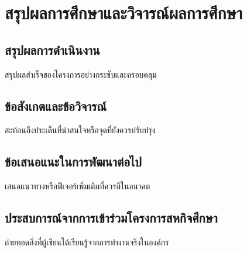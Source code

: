 \chapter{สรุปผลการศึกษาและวิจารณ์ผลการศึกษา}

\section{สรุปผลการดำเนินงาน}

สรุปผลสำเร็จของโครงการอย่างกระชับและครอบคลุม

\section{ข้อสังเกตและข้อวิจารณ์}

สะท้อนถึงประเด็นที่น่าสนใจหรือจุดที่ยังควรปรับปรุง

\section{ข้อเสนอแนะในการพัฒนาต่อไป}

เสนอแนวทางหรือฟีเจอร์เพิ่มเติมที่ควรมีในอนาคต

\section{ประสบการณ์จากการเข้าร่วมโครงการสหกิจศึกษา}

ถ่ายทอดสิ่งที่ผู้เขียนได้เรียนรู้จากการทำงานจริงในองค์กร